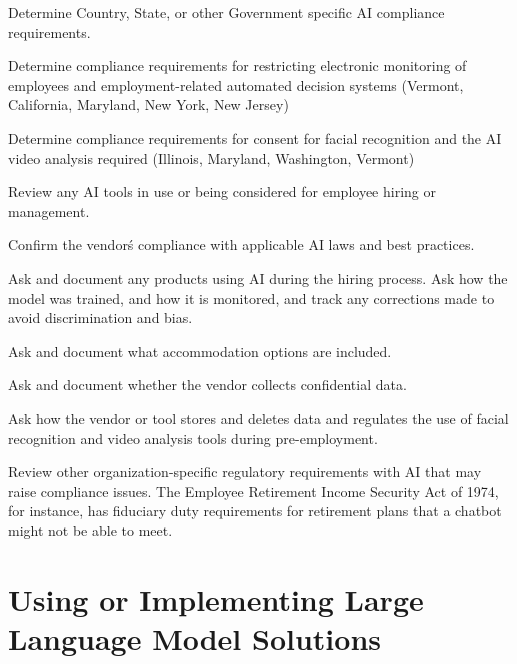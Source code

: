 \begin{minipage}{\linewidth}
\begin{checklist}
  \item Determine Country, State, or other Government specific AI compliance requirements.
  \item Determine compliance requirements for restricting electronic monitoring of employees and employment-related automated decision systems (Vermont, California, Maryland, New York, New Jersey)
  \item Determine compliance requirements for consent for facial recognition and the AI video analysis required (Illinois, Maryland, Washington, Vermont)
  \item Review any AI tools in use or being considered for employee hiring or management.
  \item Confirm the vendor\'s compliance with applicable AI laws and best practices.
  \item Ask and document any products using AI during the hiring process. Ask how the model was trained, and how it is monitored, and track any corrections made to avoid discrimination and bias.
  \item Ask and document what accommodation options are included.
  \item Ask and document whether the vendor collects confidential data.
  \item Ask how the vendor or tool stores and deletes data and regulates the use of facial recognition and video analysis tools during pre-employment.
  \item Review other organization-specific regulatory requirements with AI that may raise compliance issues. The Employee Retirement Income Security Act of 1974, for instance, has fiduciary duty requirements for retirement plans that a chatbot might not be able to meet.
\end{checklist}
\end{minipage}

\section{Using or Implementing Large Language Model Solutions}

